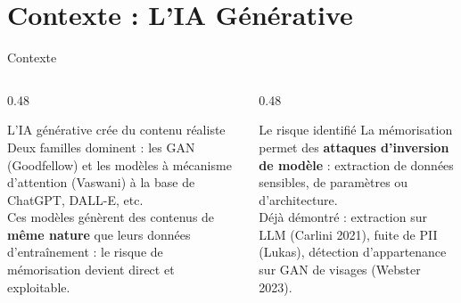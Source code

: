 \documentclass[aspectratio=169, 10pt, table]{beamer}
\begin{document}
\begin{frame}[plain]
    \titlepage
\end{frame}

\section{Contexte : L'IA Générative}

\begin{frame}{Contexte}
    \begin{columns}[T]
        \begin{column}{0.48\textwidth}
            \begin{block}{L'IA générative crée du contenu réaliste}
                Deux familles dominent : les GAN (Goodfellow) et les modèles à mécanisme d'attention (Vaswani) à la base de ChatGPT, DALL-E, etc.\\
                \vspace{0.2cm}
                Ces modèles génèrent des contenus de \textbf{même nature} que leurs données d'entraînement : le risque de mémorisation devient direct et exploitable.
            \end{block}
        \end{column}
        \begin{column}{0.48\textwidth}
            \begin{alertblock}{Le risque identifié}
                La mémorisation permet des \textbf{attaques d'inversion de modèle} : extraction de données sensibles, de paramètres ou d'architecture.\\
                \vspace{0.2cm}
                Déjà démontré : extraction sur LLM (Carlini 2021), fuite de PII (Lukas), détection d'appartenance sur GAN de visages (Webster 2023).
            \end{alertblock}
        \end{column}
    \end{columns}
\end{frame}
\end{document}
